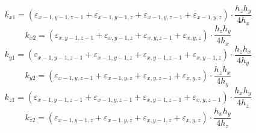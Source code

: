 \documentclass[12pt]{article}
\begin{document}
\begin{displaymath}
k_{x1}=(\varepsilon_{x-1,y-1,z-1}+\varepsilon_{x-1,y-1,z}+\varepsilon_{x-1,y,z-1}+\varepsilon_{x-1,y,z})\cdot \frac{h_{z}h_{y}}{4h_{x}}
\end{displaymath}
\begin{displaymath}
k_{x2}=(\varepsilon_{x,y-1,z-1}+\varepsilon_{x,y-1,z}+\varepsilon_{x,y,z-1}+\varepsilon_{x,y,z})\cdot \frac{h_{z}h_{y}}{4h_{x}}
\end{displaymath}
\begin{displaymath}
k_{y1}=(\varepsilon_{x-1,y-1,z-1}+\varepsilon_{x-1,y-1,z}+\varepsilon_{x,y-1,z-1}+\varepsilon_{x,y-1,z})\cdot \frac{h_{z}h_{x}}{4h_{y}}
\end{displaymath}
\begin{displaymath}
k_{y2}=(\varepsilon_{x-1,y,z-1}+\varepsilon_{x-1,y,z}+\varepsilon_{x,y,z-1}+\varepsilon_{x,y,z})\cdot \frac{h_{z}h_{x}}{4h_{y}}
\end{displaymath}
\begin{displaymath}
k_{z1}=(\varepsilon_{x-1,y-1,z-1}+\varepsilon_{x-1,y,z-1}+\varepsilon_{x,y-1,z-1}+\varepsilon_{x,y,z-1})\cdot \frac{h_{x}h_{y}}{4h_{z}}
\end{displaymath}
\begin{displaymath}
k_{z2}=(\varepsilon_{x-1,y-1,z}+\varepsilon_{x-1,y,z}+\varepsilon_{x,y-1,z}+\varepsilon_{x,y,z})\cdot \frac{h_{x}h_{y}}{4h_{z}}
\end{displaymath}
\end{document}
